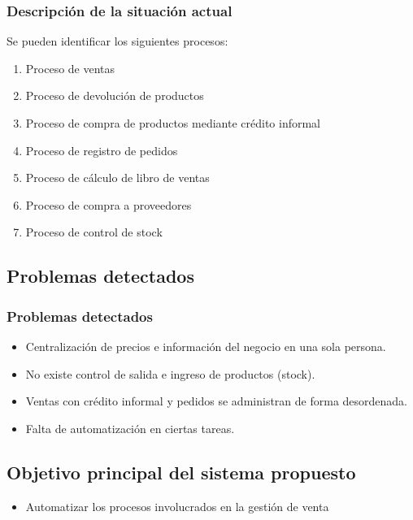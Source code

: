 \documentclass{beamer}
\begin{document}
\begin{frame}
\frametitle{Descripción de la situación actual}
Se pueden identificar los siguientes procesos:
\begin{enumerate}
\item Proceso de ventas \pause                      
\item Proceso de devolución de productos \pause
\item Proceso de compra de productos mediante crédito informal \pause
\item Proceso de registro de pedidos \pause
\item Proceso de cálculo de libro de ventas \pause
\item Proceso de compra a proveedores \pause
\item Proceso de control de stock
\end{enumerate}
\end{frame}

\subsection{Problemas detectados}

\begin{frame}
\frametitle{Problemas detectados}
\begin{itemize}
\item Centralización de precios e información del negocio en una sola persona. \pause
\item No existe control de salida e ingreso de productos (stock). \pause
\item Ventas con crédito informal y pedidos se administran de forma desordenada. \pause
\item Falta de automatización en ciertas tareas.
\end{itemize}
\end{frame}


\subsection{Objetivo principal del sistema propuesto}

\begin{frame}
\begin{itemize}
\frametitle{Objetivo principal del sistema propuesto}
\item Automatizar los procesos involucrados en la gestión de venta
\end{itemize}
\end{frame}
\end{document}

